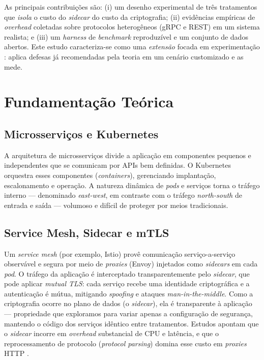 \documentclass[12pt]{article}
\begin{document}
As principais contribui\c{c}\~oes s\~ao: (i) um desenho experimental de tr\^es tratamentos que \emph{isola} o custo do \textit{sidecar} do custo da criptografia; (ii) evid\^encias emp\'iricas de \textit{overhead} coletadas sobre protocolos heterog\^eneos (gRPC e REST) em um sistema realista; e (iii) um \textit{harness} de \textit{benchmark} reproduz\'ivel e um conjunto de dados abertos. Este estudo caracteriza-se como uma \emph{extens\~ao} focada em experimenta\c{c}\~ao \cite{wohlin2012}: aplica defesas j\'a recomendadas pela teoria em um cen\'ario customizado e as mede.

\section{Fundamenta\c{c}\~ao Te\'orica}

\subsection{Microsservi\c{c}os e Kubernetes}
A arquitetura de microsservi\c{c}os divide a aplica\c{c}\~ao em componentes pequenos e independentes que se comunicam por APIs bem definidas. O Kubernetes orquestra esses componentes (\textit{containers}), gerenciando implanta\c{c}\~ao, escalonamento e opera\c{c}\~ao. A natureza din\^amica de \textit{pods} e servi\c{c}os torna o tr\'afego interno --- denominado \textit{east-west}, em contraste com o tr\'afego \textit{north-south} de entrada e sa\'ida --- volumoso e dif\'icil de proteger por meios tradicionais.

\subsection{Service Mesh, Sidecar e mTLS}
Um \textit{service mesh} (por exemplo, Istio) prov\^e comunica\c{c}\~ao servi\c{c}o-a-servi\c{c}o observ\'avel e segura por meio de \textit{proxies} (Envoy) injetados como \textit{sidecars} em cada \textit{pod}. O tr\'afego da aplica\c{c}\~ao \'e interceptado transparentemente pelo \textit{sidecar}, que pode aplicar \textit{mutual TLS}: cada servi\c{c}o recebe uma identidade criptogr\'afica e a autentica\c{c}\~ao \'e m\'utua, mitigando \textit{spoofing} e ataques \textit{man-in-the-middle}. Como a criptografia ocorre no plano de dados (o \textit{sidecar}), ela \'e transparente \`a aplica\c{c}\~ao --- propriedade que exploramos para variar apenas a configura\c{c}\~ao de seguran\c{c}a, mantendo o c\'odigo dos servi\c{c}os id\^entico entre tratamentos. Estudos apontam que o \textit{sidecar} incorre em \textit{overhead} substancial de CPU e lat\^encia, e que o reprocessamento de protocolo (\textit{protocol parsing}) domina esse custo em \textit{proxies} HTTP \cite{zhu2023}.
\end{document}
